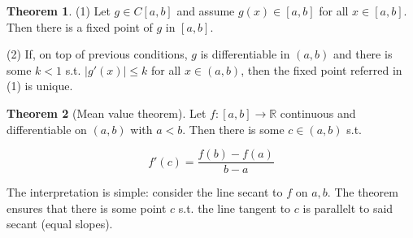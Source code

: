\documentclass[12pt]{article}
\theoremstyle{definition}
\newtheorem{theorem}{Theorem}
\begin{document}
\begin{theorem}
    (1) Let $g \in C[a, b]$ and assume $g(x) \in [a, b]$ for all $x \in [a, b]$.
    Then there is a  fixed point of $g$ in $[a, b]$.

    (2) If, on top of previous conditions, $g$ is differentiable in $(a, b)$ and
    there is some $k < 1$ s.t. $\left| g'(x) \right| \leq k$ for all $x \in
    (a,b)$, then the fixed point referred in (1) is unique.
\end{theorem}

\begin{shaded}
    \begin{theorem}[Mean value theorem]
        Let $f : [a, b] \to \mathbb{R}$ continuous and differentiable on $(a,
        b)$ with $a < b$. Then there is some $c \in (a, b)$  s.t. 

        \begin{equation*}
            f'(c) = \frac{ f(b) - f(a) }{b - a}
        \end{equation*}
    \end{theorem}

    The interpretation is simple: consider the line secant to $f$ on $a, b$. The
    theorem ensures that there is some point $c$ s.t. the line tangent to $c$ is
    parallelt to said secant (equal slopes).
\end{shaded}
\end{document}
